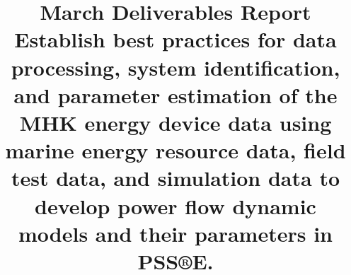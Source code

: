 \documentclass[conference]{IEEEtran}
\begin{document}
\title{March Deliverables Report\\

\vspace{10pt}
\footnotesize{Establish best practices for data processing, system identification, and parameter estimation of the MHK energy device data using marine energy resource data, field test data, and simulation data to develop power flow dynamic models and their parameters in PSS®E.}

}

\end{document}
